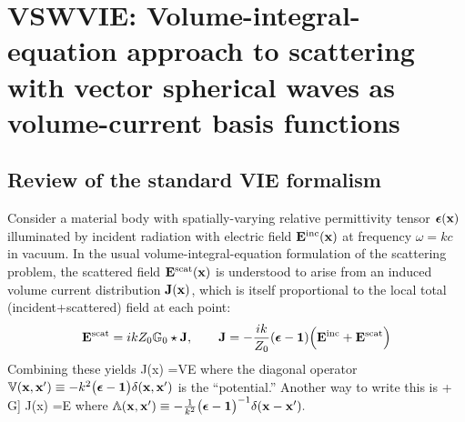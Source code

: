 \documentclass[letterpaper]{article}
\newcommand{\bbVInv}{\rotatebox[origin=c]{180}{$\mathbb{V}$}}
\begin{document}
\newpage
\section{VSWVIE: Volume-integral-equation approach to scattering with vector spherical waves as volume-current basis functions}

\subsection{Review of the standard VIE formalism}

Consider a material body with
spatially-varying relative permittivity tensor $\boldsymbol{\epsilon}(\mathbf{x})$
illuminated by incident radiation with
electric field $\mathbf{E}^{\text{\scriptsize inc}}(\mathbf{x})$
at frequency $\omega=kc$ in vacuum.
In the usual volume-integral-equation formulation of the
scattering problem, the scattered field $\mathbf{E}^{\text{\scriptsize scat}}(\mathbf{x})$
is understood to arise from an induced volume current
distribution $\mathbf{J}(\mathbf{x})$, which is itself proportional
to the local total (incident+scattered) field at each 
point:
$$
 \mathbf{E}^{\text{\scriptsize scat}} = ikZ_0 \mathbb{G}_0 \star \mathbf{J},
 \qquad
 \mathbf{J}=-\frac{ik}{Z_0}(\boldsymbol{\epsilon}-\mathbf{1})
         \Big(\mathbf{E}^{\text{\scriptsize inc}} + \mathbf{E}^{\text{\scriptsize scat}}\Big)
$$
Combining these yields
{\Big[ \vb 1 + \mb V \mb G\Big]\star
\vb J(\vb x) =\mb V\vb E
}
where the diagonal operator 
$\mathbb{V}(\mathbf{x},\mathbf{x}^\prime)\equiv -k^2 \big(\boldsymbol{\epsilon}-\mathbf{1}\big)\delta(\mathbf{x},\mathbf{x}^\prime)$ 
is the ``potential.'' Another way to write this is 
{\Big[ \bbVInv + \mb G\Big]\star 
\vb J(\vb x) =\vb E
}
where 
$ \bbVInv(\vb x,\vb x^\prime) 
 \equiv -\frac{1}{k^2}\big(\vbEps-\vb 1\big)^{-1}\delta(\vb x-\vb x^\prime).$
\end{document}
